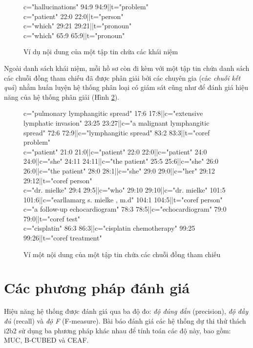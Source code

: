 \begin{figure}[ht]
\begin{mdframed}
\ttfamily\footnotesize
c="hallucinations" 94:9 94:9||t="problem"\\
c="patient" 22:0 22:0||t="person"\\
c="which" 29:21 29:21||t="pronoun"\\
c="which" 65:9 65:9||t="pronoun"
\end{mdframed}
\caption{Ví dụ nội dung của một tập tin chứa các khái niệm\label{con-eg}}
\end{figure}

Ngoài danh sách khái niệm, mỗi hồ sơ còn đi kèm với một tập tin chứa danh sách các chuỗi đồng tham chiếu đã được phân giải bởi các chuyên gia (các \emph{chuỗi kết quả}) nhằm huấn luyện hệ thống phân loại có giám sát cũng như để đánh giá hiệu năng của hệ thống phân giải (Hình \ref{chains-eg}).

\begin{figure}[ht]
\begin{mdframed}
\ttfamily\footnotesize
c="pulmonary lymphangitic spread" 17:6 17:8||c="extensive lymphatic invasion" 23:25 23:27||c="a malignant lymphangitic spread" 72:6 72:9||c="lymphangitic spread" 83:2 83:3||t="coref problem"\\
c="patient" 21:0 21:0||c="patient" 22:0 22:0||c="patient" 24:0 24:0||c="she" 24:11 24:11||c="the patient" 25:5 25:6||c="she" 26:0 26:0||c="the patient" 28:0 28:1||c="she" 29:0 29:0||c="her" 29:12 29:12||t="coref person"\\
c="dr. mielke" 29:4 29:5||c="who" 29:10 29:10||c="dr. mielke" 101:5 101:6||c="earllamarg s. mielke , m.d" 104:1 104:5||t="coref person"\\
c="a follow-up echocardiogram" 78:3 78:5||c="echocardiogram" 79:0 79:0||t="coref test"\\
c="cisplatin" 86:3 86:3||c="cisplatin chemotherapy" 99:25 99:26||t="coref treatment"
\end{mdframed}
\caption{Ví một nội dung của một tập tin chứa các chuỗi đồng tham chiếu\label{chains-eg}}
\end{figure}

\section{Các phương pháp đánh giá}
Hiệu năng hệ thống được đánh giá qua ba độ đo: \emph{độ đúng đắn} (precision), \emph{độ đầy đủ} (recall) và \emph{độ F} (F-measure). Bài báo đánh giá các hệ thống dự thi thử thách i2b2 sử dụng ba phương pháp khác nhau để tính toán các độ này, bao gồm: MUC, B-CUBED và CEAF.

